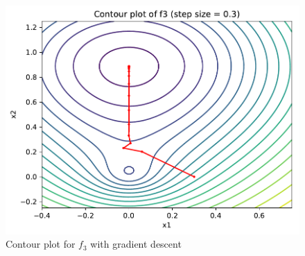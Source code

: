\documentclass[12pt,twoside]{article}
\begin{document}
\begin{figure}[h]
\centering %
\includegraphics[width = 0.65\hsize]{./figures/contour_f3.pdf} %
\caption{Contour plot for $f_3$ with gradient descent} %
\label{fig:f3}
\end{figure}
\pagebreak
\end{document}
